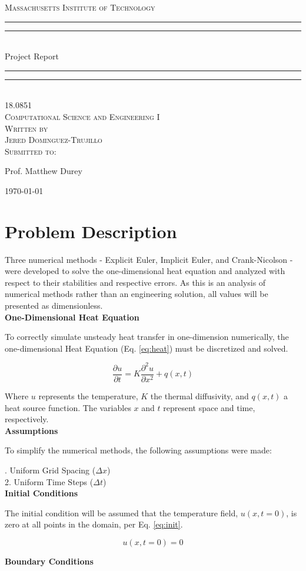 \documentclass[10pt, letter, showtrims]{extarticle}
\newcommand{\University}{Massachusetts Institute of Technology}
\newcommand{\ClassCode}{18.0851}
\newcommand{\ClassTitle}{Computational Science and Engineering I}
\newcommand{\Title}{Project Report}
\newcommand{\FirstName}{Jered}
\newcommand{\LastName}{Dominguez-Trujillo}
\newcommand{\ProfTitle}{Prof.}
\newcommand{\ProfFirst}{Matthew}
\newcommand{\ProfLast}{Durey}
\newcommand*{\titleGP}{\begingroup %
\centering %

\textsc{\LARGE \University{}} \\[2\baselineskip] %

\rule{\textwidth}{1.6pt}\vspace*{-\baselineskip}\vspace*{2pt} %
\rule{\textwidth}{0.4pt}\\[\baselineskip] %

{\LARGE \Title{}}\\[0.2\baselineskip] %

\rule{\textwidth}{0.4pt}\vspace*{-\baselineskip}\vspace{3.2pt} %
\rule{\textwidth}{1.6pt}\\[\baselineskip] %

\scshape %
{\large \ClassCode{}} \\[0.5\baselineskip]
{\large \ClassTitle{}} \\[4\baselineskip]


Written by \\[0.5\baselineskip]
{\Large \FirstName{} \LastName{}}\\[2\baselineskip] %
Submitted to: \\[0.5\baselineskip]
{\Large \ProfTitle{} \ProfFirst{} \ProfLast{}\par} %
\vspace*{16\baselineskip}
{\large \today}\par 
\vfill %

\endgroup}
\begin{document}
 
	\begin{titlepage}
		\titleGP{}
	\end{titlepage}

	\section{Problem Description}

		\noindent
		Three numerical methods - Explicit Euler, Implicit Euler, and Crank-Nicolson - were developed to solve the one-dimensional heat equation and analyzed with respect to their stabilities and respective errors. As this is an analysis of numerical methods rather than an engineering solution, all values will be presented as dimensionless. \\
		
		\noindent
		\textbf{One-Dimensional Heat Equation}
		
		\noindent
		To correctly simulate unsteady heat transfer in one-dimension numerically, the one-dimensional Heat Equation (Eq. \ref{eq:heat}) must be discretized and solved.
		
		\begin{equation}
			\label{eq:heat}
			\frac{\partial u}{\partial t} = K \frac{\partial^{2} u}{\partial x^{2}} + q(x, t)
		\end{equation}

		\noindent
		Where $u$ represents the temperature, $K$ the thermal diffusivity, and $q(x,t)$ a heat source function. The variables $x$ and $t$ represent space and time, respectively.\\		
		
		\noindent
		\textbf{Assumptions}
	
		\noindent
		To simplify the numerical methods, the following assumptions were made:
		
		. Uniform Grid Spacing ($\Delta x$) \\
		2. Uniform Time Steps   ($\Delta t$) \\	

		\noindent
		\textbf{Initial Conditions}
		
		\noindent
		The initial condition will be assumed that the temperature field, $u(x, t = 0)$, is zero at all points in the domain, per Eq. \ref{eq:init}.
		
		\begin{equation}
		\label{eq:init}
			u(x, t = 0) = 0
		\end{equation}	
	
		\noindent
		\textbf{Boundary Conditions}
\end{document}
